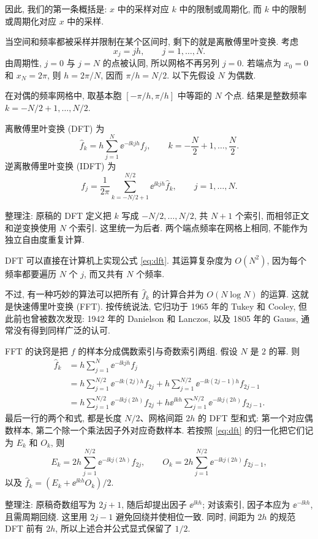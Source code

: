 因此, 我们的第一条概括是: $x$ 中的采样对应 $k$ 中的限制或周期化, 而 $k$ 中的限制或周期化对应 $x$ 中的采样.

\label{sec:dft-fft}
当空间和频率都被采样并限制在某个区间时, 剩下的就是离散傅里叶变换. 考虑
\[
x_j=jh,\qquad j=1,\ldots,N.
\]
由周期性, $j=0$ 与 $j=N$ 的点被认同, 所以网格不再另列 $j=0$. 若端点为 $x_0=0$ 和 $x_N=2\pi$, 则 $h=2\pi/N$, 因而 $\pi/h=N/2$. 以下先假设 $N$ 为偶数.

在对偶的频率网格中, 取基本胞 $[-\pi/h,\pi/h]$ 中等距的 $N$ 个点. 结果是整数频率 $k=-N/2+1,\ldots,N/2$.

\begin{definition}[离散傅里叶变换]
离散傅里叶变换 (DFT) 为
\begin{equation}\label{eq:dft}
\widehat f_k=h\sum_{j=1}^{N}\ee^{-\ii kjh}f_j,
\qquad k=-\frac N2+1,\ldots,\frac N2.
\end{equation}
逆离散傅里叶变换 (IDFT) 为
\begin{equation}\label{eq:idft}
f_j=\frac1{2\pi}\sum_{k=-N/2+1}^{N/2}\ee^{\ii kjh}\widehat f_k,
\qquad j=1,\ldots,N.
\end{equation}
\end{definition}
\begin{remark}
整理注: 原稿的 DFT 定义把 $k$ 写成 $-N/2,\ldots,N/2$, 共 $N+1$ 个索引, 而相邻正文和逆变换使用 $N$ 个索引. 这里统一为后者. 两个端点频率在网格上相同, 不能作为独立自由度重复计算.
\end{remark}

DFT 可以直接在计算机上实现公式 \eqref{eq:dft}. 其运算复杂度为 $O(N^2)$, 因为每个频率都要遍历 $N$ 个 $j$, 而又共有 $N$ 个频率.

不过, 有一种巧妙的算法可以把所有 $\widehat f_k$ 的计算合并为 $O(N\log N)$ 的运算. 这就是快速傅里叶变换 (FFT). 按传统说法, 它归功于 1965 年的 Tukey 和 Cooley, 但此前也曾被数次发现: 1942 年的 Danielson 和 Lanczos, 以及 1805 年的 Gauss, 通常没有得到同样广泛的认可.

FFT 的诀窍是把 $f$ 的样本分成偶数索引与奇数索引两组. 假设 $N$ 是 $2$ 的幂. 则
\begin{align*}
\widehat f_k
&=h\sum_{j=1}^{N}\ee^{-\ii kjh}f_j\\
&=h\sum_{j=1}^{N/2}\ee^{-\ii k(2j)h}f_{2j}
+h\sum_{j=1}^{N/2}\ee^{-\ii k(2j-1)h}f_{2j-1}\\
&=h\sum_{j=1}^{N/2}\ee^{-\ii kj(2h)}f_{2j}
+h\ee^{\ii kh}\sum_{j=1}^{N/2}\ee^{-\ii kj(2h)}f_{2j-1}.
\end{align*}
最后一行的两个和式, 都是长度 $N/2$、网格间距 $2h$ 的 DFT 型和式: 第一个对应偶数样本, 第二个除一个乘法因子外对应奇数样本. 若按照 \eqref{eq:dft} 的归一化把它们记为 $E_k$ 和 $O_k$, 则
\[
E_k=2h\sum_{j=1}^{N/2}\ee^{-\ii kj(2h)}f_{2j},\qquad
O_k=2h\sum_{j=1}^{N/2}\ee^{-\ii kj(2h)}f_{2j-1},
\]
以及 $\widehat f_k=(E_k+\ee^{\ii kh}O_k)/2$.
\begin{remark}
整理注: 原稿奇数组写为 $2j+1$, 随后却提出因子 $\ee^{\ii kh}$; 对该索引, 因子本应为 $\ee^{-\ii kh}$, 且需周期回绕. 这里用 $2j-1$ 避免回绕并使相位一致. 同时, 间距为 $2h$ 的规范 DFT 前有 $2h$, 所以上述合并公式显式保留了 $1/2$.
\end{remark}

